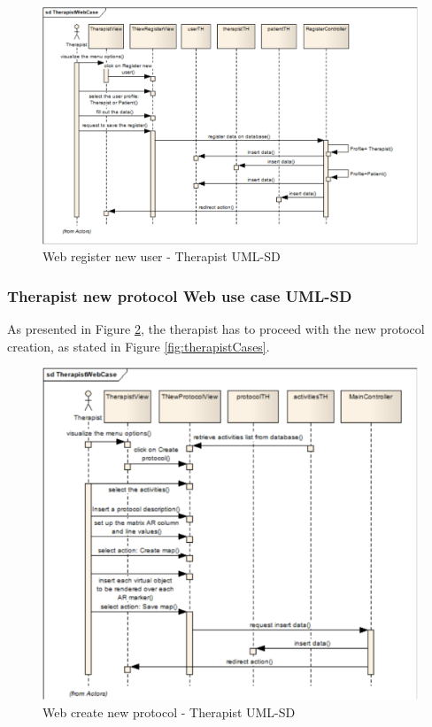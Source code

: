 \begin{figure}[!hbt]
\begin{center}
\includegraphics[width=0.7 \textwidth]{img/cap4/UMLSD-TherapistWebCase02}
\caption{Web register new user - Therapist UML-SD}
\label{fig:UMLSD-TherapistWebCase02}
\end{center}
\vspace{-20pt}
\end{figure} 

\subsubsection{Therapist new protocol Web use case UML-SD}

As presented in Figure \ref{fig:UMLSD-TherapistWebCase03}, the therapist has to proceed with the new protocol creation, as stated in Figure \ref{fig:therapistCases}. 

\begin{figure}[!hbt]
\begin{center}
\includegraphics[width=0.65 \textwidth]{img/cap4/UMLSD-TherapistWebCase03}
\caption{Web create new protocol - Therapist UML-SD}
\label{fig:UMLSD-TherapistWebCase03}
\end{center}
\end{figure} 

